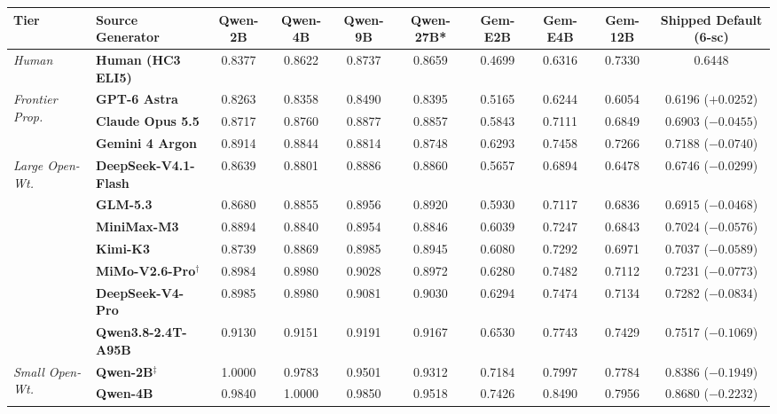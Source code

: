 \documentclass[11pt,a4paper,twocolumn]{article}
\begin{document}
\begin{table}[t]
\centering
\scriptsize
\setlength{\tabcolsep}{3.8pt}
\begin{tabular}{llcccccccc}
\toprule
\textbf{Tier} & \textbf{Source Generator} & \textbf{Qwen-2B} & \textbf{Qwen-4B} & \textbf{Qwen-9B} & \textbf{Qwen-27B*} & \textbf{Gem-E2B} & \textbf{Gem-E4B} & \textbf{Gem-12B} & \textbf{Shipped Default (6-sc)} \\
\midrule
\textit{Human} & \textbf{Human (HC3 ELI5)} & 0.8377 & 0.8622 & 0.8737 & 0.8659 & 0.4699 & 0.6316 & 0.7330 & 0.6448 \\
\midrule
\multirow{3}{*}{\textit{Frontier Prop.}}
 & \textbf{GPT-6 Astra} & 0.8263 & 0.8358 & 0.8490 & 0.8395 & 0.5165 & 0.6244 & 0.6054 & 0.6196 ($+0.0252$) \\
 & \textbf{Claude Opus 5.5} & 0.8717 & 0.8760 & 0.8877 & 0.8857 & 0.5843 & 0.7111 & 0.6849 & 0.6903 ($-0.0455$) \\
 & \textbf{Gemini 4 Argon} & 0.8914 & 0.8844 & 0.8814 & 0.8748 & 0.6293 & 0.7458 & 0.7266 & 0.7188 ($-0.0740$) \\
\midrule
\multirow{7}{*}{\textit{Large Open-Wt.}}
 & \textbf{DeepSeek-V4.1-Flash} & 0.8639 & 0.8801 & 0.8886 & 0.8860 & 0.5657 & 0.6894 & 0.6478 & 0.6746 ($-0.0299$) \\
 & \textbf{GLM-5.3} & 0.8680 & 0.8855 & 0.8956 & 0.8920 & 0.5930 & 0.7117 & 0.6836 & 0.6915 ($-0.0468$) \\
 & \textbf{MiniMax-M3} & 0.8894 & 0.8840 & 0.8954 & 0.8846 & 0.6039 & 0.7247 & 0.6843 & 0.7024 ($-0.0576$) \\
 & \textbf{Kimi-K3} & 0.8739 & 0.8869 & 0.8985 & 0.8945 & 0.6080 & 0.7292 & 0.6971 & 0.7037 ($-0.0589$) \\
 & \textbf{MiMo-V2.6-Pro}$^{\dagger}$ & 0.8984 & 0.8980 & 0.9028 & 0.8972 & 0.6280 & 0.7482 & 0.7112 & 0.7231 ($-0.0773$) \\
 & \textbf{DeepSeek-V4-Pro} & 0.8985 & 0.8980 & 0.9081 & 0.9030 & 0.6294 & 0.7474 & 0.7134 & 0.7282 ($-0.0834$) \\
 & \textbf{Qwen3.8-2.4T-A95B} & 0.9130 & 0.9151 & 0.9191 & 0.9167 & 0.6530 & 0.7743 & 0.7429 & 0.7517 ($-0.1069$) \\
\midrule
\multirow{7}{*}{\textit{Small Open-Wt.}}
 & \textbf{Qwen-2B}$^{\ddagger}$ & 1.0000 & 0.9783 & 0.9501 & 0.9312 & 0.7184 & 0.7997 & 0.7784 & 0.8386 ($-0.1949$) \\
 & \textbf{Qwen-4B} & 0.9840 & 1.0000 & 0.9850 & 0.9518 & 0.7426 & 0.8490 & 0.7956 & 0.8680 ($-0.2232$) \\

\end{tabular}
\end{table}
\end{document}
